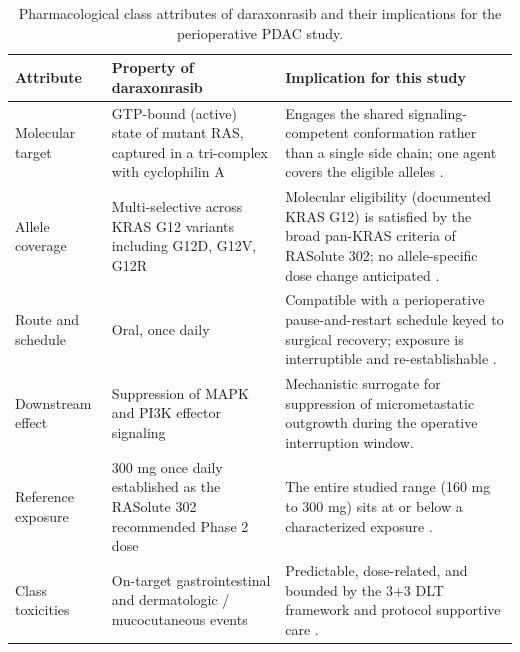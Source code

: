 \begin{table}[t]
\centering
\caption{Pharmacological class attributes of daraxonrasib and their implications
for the perioperative PDAC study.}
\label{tab:sec07-class}
\begin{tabularx}{\textwidth}{L{3.3cm} L{4.3cm} Y}
\toprule
\textbf{Attribute} & \textbf{Property of daraxonrasib} & \textbf{Implication for this study} \\
\midrule
Molecular target & GTP-bound (active) state of mutant RAS, captured in a tri-complex with cyclophilin A & Engages the shared signaling-competent conformation rather than a single side chain; one agent covers the eligible alleles \cite{daraxwhipple}. \\
Allele coverage & Multi-selective across KRAS G12 variants including G12D, G12V, G12R & Molecular eligibility (documented KRAS G12) is satisfied by the broad pan-KRAS criteria of RASolute 302; no allele-specific dose change anticipated \cite{onpremwhippl}. \\
Route and schedule & Oral, once daily & Compatible with a perioperative pause-and-restart schedule keyed to surgical recovery; exposure is interruptible and re-establishable \cite{onpremwhippl}. \\
Downstream effect & Suppression of MAPK and PI3K effector signaling & Mechanistic surrogate for suppression of micrometastatic outgrowth during the operative interruption window. \\
Reference exposure & 300 mg once daily established as the RASolute 302 recommended Phase 2 dose & The entire studied range (160 mg to 300 mg) sits at or below a characterized exposure \cite{daraxwhipple}. \\
Class toxicities & On-target gastrointestinal and dermatologic / mucocutaneous events & Predictable, dose-related, and bounded by the 3+3 DLT framework and protocol supportive care \cite{onpremwhippl}. \\
\bottomrule
\end{tabularx}
\end{table}


